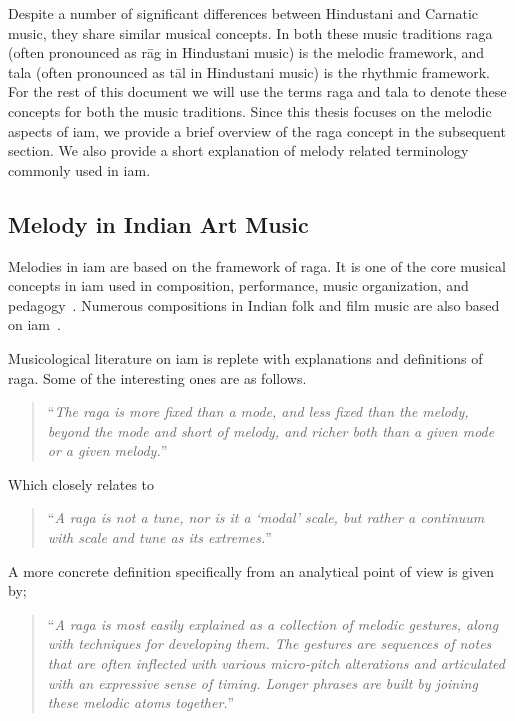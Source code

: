 Despite a number of significant differences between Hindustani and Carnatic music, they share similar musical concepts. In both these music traditions \gls{raga} (often pronounced as r\={a}g in Hindustani music) is the melodic framework, and \gls{tala} (often pronounced as t\={a}l in Hindustani music) is the rhythmic framework. For the rest of this document we will use the terms \gls{raga} and \gls{tala} to denote these concepts for both the music traditions. Since this thesis focuses on the melodic aspects of \gls{iam}, we provide a brief overview of the \gls{raga} concept in the subsequent section. We also provide a short explanation of melody related terminology commonly used in \gls{iam}. 


\subsection{Melody in Indian Art Music}
\label{sec:melody_in_iam}

Melodies in \gls{iam} are based on the framework of \gls{raga}. It is one of the core musical concepts in \gls{iam} used in composition, performance, music organization, and pedagogy~\citep{Bagchee1998,Danielou2010}. Numerous compositions in Indian folk and film music are also based on \gls{iam}~\citep{ganti2013bollywood}.

Musicological literature on \gls{iam} is replete with explanations and definitions of \gls{raga}. Some of the interesting ones are as follows.

\blockcquote[p. 96]{martinez2001semiosis}{``\textit{The \gls{raga} is more fixed than a mode, and less fixed than the melody, beyond the mode and short of melody, and richer both than a given mode or a given melody.}''}

Which closely relates to

\blockcquote[]{powers1963background}{``\textit{A \gls{raga} is not a tune, nor is it a `modal' scale, but rather a continuum with scale and tune as its extremes.}''}

A more concrete definition specifically from an analytical point of view is given by;

\blockcquote[]{chordia2013joint}{``\textit{A \gls{raga} is most easily explained as a collection of melodic gestures, along with techniques for developing them. The gestures are sequences of notes that are often inflected with various micro-pitch alterations and articulated with an expressive sense of timing. Longer phrases are built by joining these melodic atoms together.}''}

